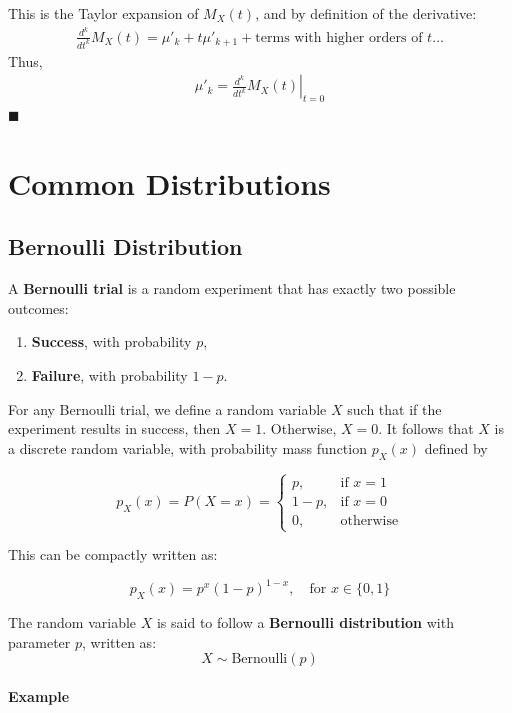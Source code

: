 \documentclass[twoside]{book}
\begin{document}
This is the Taylor expansion of \( M_X(t) \), and by definition of the derivative:
\begin{align*}
    \frac{d^k}{dt^k} M_X(t) = \mu'_k + t\mu'_{k+1} + \text{terms with higher orders of }t \dots
\end{align*}
Thus,
\begin{align*}
    \mu'_k = \left. \frac{d^k}{dt^k} M_X(t) \right|_{t=0}
\end{align*}
\hfill\(\blacksquare\)


\chapter{Common Distributions}

\section{Bernoulli Distribution}

A \textbf{Bernoulli trial} is a random experiment that has exactly two possible outcomes:
\begin{enumerate}
    \item \textbf{Success}, with probability $p$,
    \item \textbf{Failure}, with probability $1 - p$.
\end{enumerate}

For any Bernoulli trial, we define a random variable $X$ such that if the experiment results in success, then $X = 1$. Otherwise, $X = 0$. It follows that $X$ is a discrete random
variable, with probability mass function $p_X(x)$ defined by

\begin{textbox}
    \[
p_X(x) = P(X = x) =
\begin{cases}
p, & \text{if } x = 1 \\
1 - p, & \text{if } x = 0 \\
0, & \text{otherwise}
\end{cases}
\]
\end{textbox}

This can be compactly written as:
\begin{textbox}
    \[
p_X(x) = p^x (1 - p)^{1 - x}, \quad \text{for } x \in \{0, 1\}
\]
\end{textbox}

The random variable $X$ is said to follow a \textbf{Bernoulli distribution} with parameter $p$, written as:
\[
X \sim \text{Bernoulli}(p)
\]
\subsubsection{Example}
\end{document}
